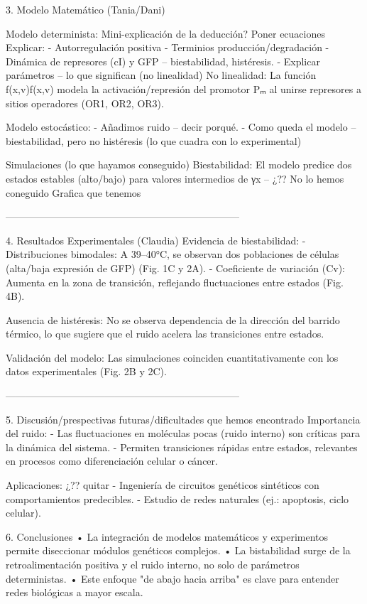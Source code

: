 3. Modelo Matemático (Tania/Dani)

Modelo determinista:
Mini-explicación de la deducción?
Poner ecuaciones
Explicar:
-	Autorregulación positiva
-	Terminios producción/degradación
-	Dinámica de represores (cI) y GFP – biestabilidad, histéresis.
-	Explicar parámetros – lo que significan (no linealidad)
No linealidad: La función f(x,v)f(x,v) modela la activación/represión del promotor Pₘ al unirse represores a sitios operadores (OR1, OR2, OR3).

Modelo estocástico:
-	Añadimos ruido – decir porqué. 
-	Como queda el modelo – biestabilidad, pero no histéresis (lo que cuadra con lo experimental)

Simulaciones (lo que hayamos conseguido)
Biestabilidad: El modelo predice dos estados estables (alto/bajo) para valores intermedios de γx – ¿?? No lo hemos coneguido
Grafica que tenemos

-----------------------------------------------------------------------

4. Resultados Experimentales (Claudia)
Evidencia de biestabilidad:
- Distribuciones bimodales: A 39–40°C, se observan dos poblaciones de células (alta/baja expresión de GFP) (Fig. 1C y 2A).
- Coeficiente de variación (Cv): Aumenta en la zona de transición, reflejando fluctuaciones entre estados (Fig. 4B).

Ausencia de histéresis:
No se observa dependencia de la dirección del barrido térmico, lo que sugiere que el ruido acelera las transiciones entre estados.

Validación del modelo:
Las simulaciones coinciden cuantitativamente con los datos experimentales (Fig. 2B y 2C).

-----------------------------------------------------------------------

5. Discusión/prespectivas futuras/dificultades que hemos encontrado
Importancia del ruido:
- Las fluctuaciones en moléculas pocas (ruido interno) son críticas para la dinámica del sistema.
- Permiten transiciones rápidas entre estados, relevantes en procesos como diferenciación celular o cáncer.

Aplicaciones: ¿?? quitar
- Ingeniería de circuitos genéticos sintéticos con comportamientos predecibles.
- Estudio de redes naturales (ej.: apoptosis, ciclo celular).

6. Conclusiones
•	La integración de modelos matemáticos y experimentos permite diseccionar módulos genéticos complejos.
•	La bistabilidad surge de la retroalimentación positiva y el ruido interno, no solo de parámetros deterministas.
•	Este enfoque "de abajo hacia arriba" es clave para entender redes biológicas a mayor escala.




